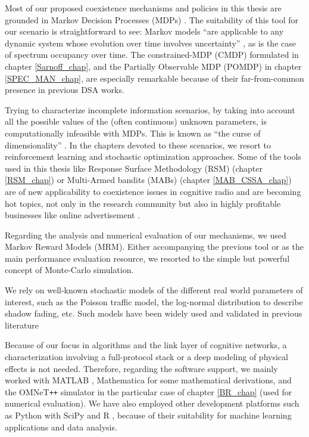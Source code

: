 Most of our proposed coexistence mechanisms and policies in this thesis are grounded in Markov Decision Processes (MDPs) \cite{ref:Puterman2005}. 
The suitability of this tool for our scenario is straightforward to see: Markov models \enquote{are applicable to any dynamic system whose evolution over time involves uncertainty} \cite{ref:Bertsekas2012}, as is the case of spectrum occupancy over time. 
The constrained-MDP (CMDP) formulated in chapter \ref{Sarnoff_chap}, and the Partially Observable MDP (POMDP) in chapter \ref{SPEC_MAN_chap}, are especially remarkable because of their far-from-common presence in previous DSA works. 

Trying to characterize incomplete information scenarios, by taking into account all the possible values of the (often continuous) unknown parameters, is computationally infeasible with MDPs. 
This is known as \enquote{the curse of dimensionality} \cite{ref:Powell2012}. 
In the chapters devoted to these scenarios, we resort to reinforcement learning and stochastic optimization approaches. 
Some of the tools used in this thesis like Response Surface Methodology (RSM) (chapter \ref{RSM_chap}) or Multi-Armed bandits (MABs) (chapter \ref{MAB_CSSA_chap}) are of new applicability to coexistence issues in cognitive radio and are becoming hot topics, not only in the research community \cite{ref:Bkassiny2013} but also in highly profitable businesses like online advertisement \cite{ref:White2012}. 

Regarding the analysis and numerical evaluation of our mechanisms, we used Markov Reward Models (MRM). Either accompanying the previous tool or as the main performance evaluation resource, we resorted to the simple but powerful concept of Monte-Carlo simulation.

We rely on well-known stochastic models of the different real world parameters of interest, such as the Poisson traffic model, the log-normal distribution to describe shadow fading, etc. Such models have been widely used and validated in previous literature \cite{ref:Goldsmith2005}

Because of our focus in algorithms and the link layer of cognitive networks, a characterization involving a full-protocol stack or a deep modeling of physical effects is not needed. Therefore, regarding the software support, we mainly worked with MATLAB \cite{ref:MATLAB}, Mathematica \cite{ref:Mathematica} for some mathematical derivations, and the OMNeT\verb!++! simulator \cite{ref:Omnet} in the particular case of chapter \ref{BR_chap} (used for numerical evaluation). We have also employed other development platforms such as Python with SciPy \cite{ref:SciPy} and R \cite{ref:RStudio}, because of their suitability for machine learning applications and data analysis.



